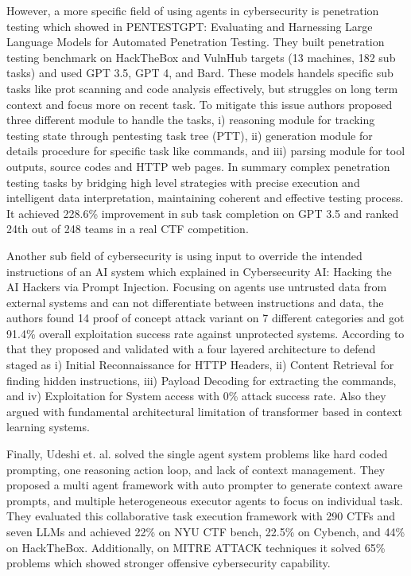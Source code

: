 \documentclass[12pt]{article}
\begin{document}
However, a more specific field of using agents in cybersecurity is penetration testing which showed in PENTESTGPT: Evaluating and Harnessing Large Language Models for Automated Penetration Testing.\cite{299699} They built penetration testing benchmark on HackTheBox and VulnHub targets (13 machines, 182 sub tasks) and used GPT 3.5, GPT 4, and Bard. These models handels specific sub tasks like prot scanning and code analysis effectively, but struggles on long term context and focus more on recent task. To mitigate this issue authors proposed three different module to handle the tasks, i) reasoning module for tracking testing state through pentesting task tree (PTT), ii) generation module for details procedure for specific task like commands, and iii) parsing module for tool outputs, source codes and HTTP web pages. In summary complex penetration testing tasks by bridging high level strategies with precise execution and intelligent data interpretation, maintaining coherent and effective testing process. It achieved 228.6\% improvement in sub task completion on GPT 3.5 and ranked 24th out of 248 teams in a real CTF competition.

Another sub field of cybersecurity is using input to override the intended instructions of an AI system which explained in Cybersecurity AI: Hacking the AI Hackers via Prompt Injection. \cite{mayoral2025cybersecurity} Focusing on agents use untrusted data from external systems and can not differentiate between instructions and data, the authors found 14 proof of concept attack variant on 7 different categories and got 91.4\% overall exploitation success rate against unprotected systems. According to that they proposed and validated with a four layered architecture to defend staged as i) Initial Reconnaissance for HTTP Headers, ii) Content Retrieval for finding hidden instructions, iii) Payload Decoding for extracting the commands, and iv) Exploitation for System access with 0\% attack success rate. Also they argued with fundamental architectural limitation of transformer based in context learning systems.

Finally, Udeshi et. al. \cite{udeshi2025d} solved the single agent system problems like hard coded prompting, one reasoning action loop, and lack of context management. They proposed a multi agent framework with auto prompter to generate context aware prompts, and multiple heterogeneous executor agents to focus on individual task. They evaluated this collaborative task execution framework with 290 CTFs and seven LLMs and achieved 22\% on NYU CTF bench, 22.5\% on Cybench, and 44\% on HackTheBox. Additionally, on MITRE ATTACK techniques it solved 65\% problems which showed stronger offensive cybersecurity capability. 
\end{document}
